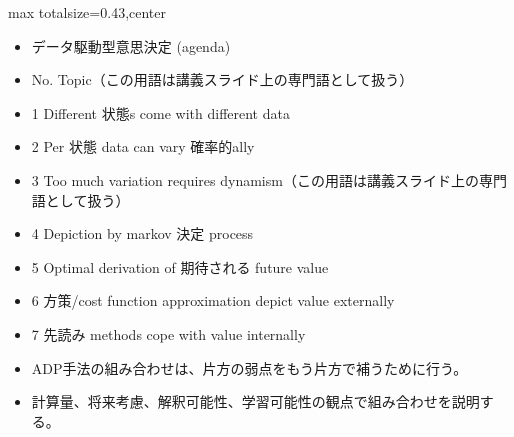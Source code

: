 \clearpage
{}
\begin{minipage}[t]{0.405\textwidth}
\begin{adjustbox}{max totalsize={\textwidth}{0.43\textheight},center}
\begin{minipage}{\textwidth}\scriptsize
{}\begin{itemize}
\item データ駆動型意思決定 (agenda)
\item No. Topic（この用語は講義スライド上の専門語として扱う）
\item 1 Different 状態s come with different data
\item 2 Per 状態 data can vary 確率的ally
\item 3 Too much variation requires dynamism（この用語は講義スライド上の専門語として扱う）
\item 4 Depiction by markov 決定 process
\item 5 Optimal derivation of 期待される future value
\item 6 方策/cost function approximation depict value externally
\item 7 先読み methods cope with value internally
\end{itemize}\begin{itemize}
\item ADP手法の組み合わせは、片方の弱点をもう片方で補うために行う。
\item 計算量、将来考慮、解釈可能性、学習可能性の観点で組み合わせを説明する。
\end{itemize}
\end{minipage}
\end{adjustbox}
\end{minipage}\hfill
